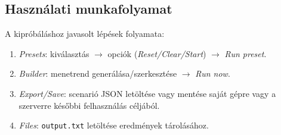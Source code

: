 \subsection{Használati munkafolyamat}
A kipróbáláshoz javasolt lépések folyamata:
\begin{enumerate}
  \item \emph{Presets}: kiválasztás \(\rightarrow\) opciók 
  (\emph{Reset/Clear/Start}) \(\rightarrow\) \emph{Run preset}.
  \item \emph{Builder}: menetrend generálása/szerkesztése 
  \(\rightarrow\) \emph{Run now}.
  \item \emph{Export/Save}: scenarió JSON letöltése vagy mentése saját gépre vagy a szerverre 
  későbbi felhasználás céljából.
  \item \emph{Files}: \texttt{output.txt} letöltése eredmények tárolásához.
\end{enumerate}